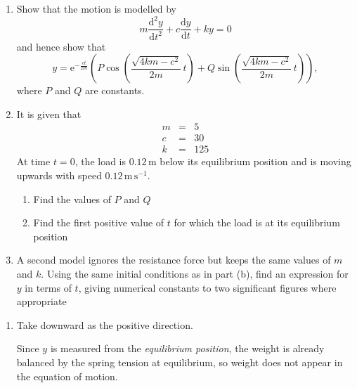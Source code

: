 \documentclass[leqno]{article}
\begin{document}
\begin{enumerate}[
  label=\textbf{\arabic*.},
  leftmargin=*,
  topsep=0pt,
  partopsep=0pt,
  parsep=0pt
]
\begin{enumerate}[label=\textbf{(\alph*)}]
  \item Show that the motion is modelled by
  \[
  m\frac{\mathrm{d}^2 y}{\mathrm{d} t^2}+c\frac{\mathrm{d} y}{\mathrm{d} t}+ky=0
  \]
  and hence show that
  \[
  y=\mathrm{e}^{-\frac{c t}{2m}}\left(P\cos\left(\frac{\sqrt{4km-c^2}}{2m}\,t\right)+Q\sin\left(\frac{\sqrt{4km-c^2}}{2m}\,t\right)\right),
  \]
  where $P$ and $Q$ are constants.  \\
  \item It is given that
  \[
  \renewcommand{\arraystretch}{1.2}
  \begin{array}{rcl}
  m&=&5\\
  c&=&30\\
  k&=&125
  \end{array}
  \]
  At time $t=0$, the load is $0.12\,\mathrm{m}$ below its equilibrium position and is moving upwards with speed $0.12\,\mathrm{m\,s^{-1}}$. \\
  \begin{enumerate}[label=(\roman*)]
    \item Find the values of $P$ and $Q$ 
    \item Find the first positive value of $t$ for which the load is at its equilibrium position  \\
  \end{enumerate}
  \item A second model ignores the resistance force but keeps the same values of $m$ and $k$. Using the same initial conditions as in part (b), find an expression for $y$ in terms of $t$, giving numerical constants to two significant figures where appropriate  \\
\end{enumerate}

\vspace*{30pt}

\begin{tcolorbox}[colback=white, colframe=scarlet, title={\textbf{Solution}}, breakable, grow to left by=6mm, grow to right by=10mm]
\begin{enumerate}[label=\textbf{(\alph*)}]
  \item Take downward as the positive direction.

  Since $y$ is measured from the \emph{equilibrium position}, the weight is already balanced by the spring tension at equilibrium, so weight does not appear in the equation of motion.


\end{enumerate}
\end{tcolorbox}
\end{enumerate}
\end{document}
